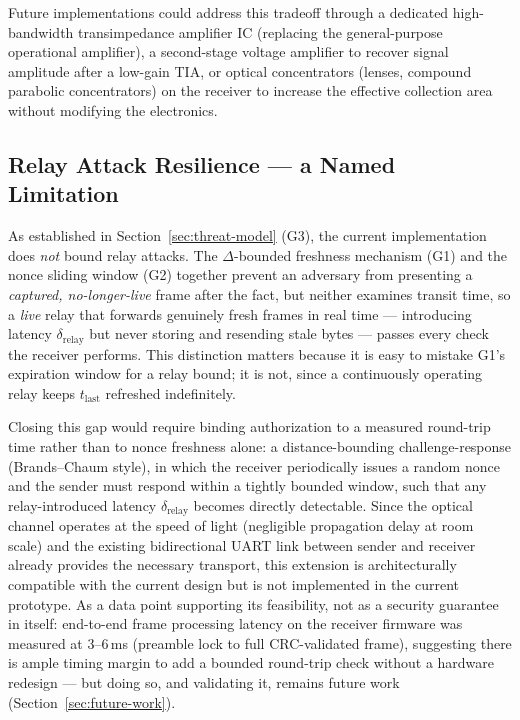 \documentclass[conference]{IEEEtran}
\begin{document}
Future implementations could address this tradeoff through a dedicated high-bandwidth transimpedance amplifier IC (replacing the general-purpose operational amplifier), a second-stage voltage amplifier to recover signal amplitude after a low-gain TIA, or optical concentrators (lenses, compound parabolic concentrators) on the receiver to increase the effective collection area without modifying the electronics.

\subsection{Relay Attack Resilience — a Named Limitation}

As established in Section~\ref{sec:threat-model} (G3), the current implementation does \emph{not} bound relay attacks. The $\Delta$-bounded freshness mechanism (G1) and the nonce sliding window (G2) together prevent an adversary from presenting a \emph{captured, no-longer-live} frame after the fact, but neither examines transit time, so a \emph{live} relay that forwards genuinely fresh frames in real time — introducing latency $\delta_{\text{relay}}$ but never storing and resending stale bytes — passes every check the receiver performs. This distinction matters because it is easy to mistake G1's expiration window for a relay bound; it is not, since a continuously operating relay keeps $t_{\text{last}}$ refreshed indefinitely.

Closing this gap would require binding authorization to a measured round-trip time rather than to nonce freshness alone: a distance-bounding challenge-response (Brands--Chaum style), in which the receiver periodically issues a random nonce and the sender must respond within a tightly bounded window, such that any relay-introduced latency $\delta_{\text{relay}}$ becomes directly detectable. Since the optical channel operates at the speed of light (negligible propagation delay at room scale) and the existing bidirectional UART link between sender and receiver already provides the necessary transport, this extension is architecturally compatible with the current design but is not implemented in the current prototype. As a data point supporting its feasibility, not as a security guarantee in itself: end-to-end frame processing latency on the receiver firmware was measured at 3--6\,ms (preamble lock to full CRC-validated frame), suggesting there is ample timing margin to add a bounded round-trip check without a hardware redesign — but doing so, and validating it, remains future work (Section~\ref{sec:future-work}).
\end{document}
